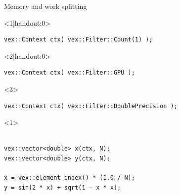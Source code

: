 \documentclass[@BEAMER_OPTIONS@]{beamer}
\begin{document}
\begin{frame}[fragile]{Memory and work splitting}
    \begin{exampleblock}{}
        \begin{onlyenv}<1|handout:0>
        \begin{lstlisting}
vex::Context ctx( vex::Filter::Count(1) );
        \end{lstlisting}
        \end{onlyenv}
        \begin{onlyenv}<2|handout:0>
        \begin{lstlisting}
vex::Context ctx( vex::Filter::GPU );
        \end{lstlisting}
        \end{onlyenv}
        \begin{onlyenv}<3>
        \begin{lstlisting}
vex::Context ctx( vex::Filter::DoublePrecision );
        \end{lstlisting}
        \end{onlyenv}
        \begin{uncoverenv}<1>
        \begin{lstlisting}[firstnumber=last]

vex::vector<double> x(ctx, N);
vex::vector<double> y(ctx, N);

x = vex::element_index() * (1.0 / N);
y = sin(2 * x) + sqrt(1 - x * x);
        \end{lstlisting}
        \end{uncoverenv}
    \end{exampleblock}
    \begin{figure}
\end{figure}
\end{frame}
\end{document}
